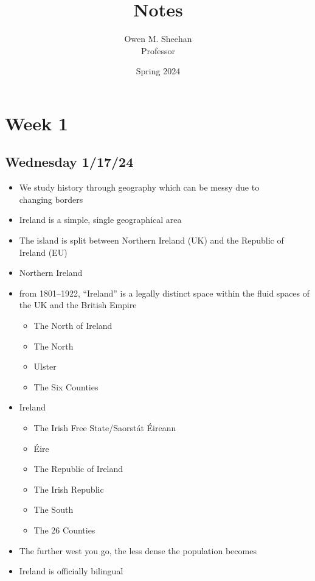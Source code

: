 \documentclass[12pt]{article}
\title{\class{} Notes}
\author{Owen M. Sheehan\\Professor \prof{}}
\date{Spring 2024}
\begin{document}
\maketitle
\tableofcontents
\newpage
    \section{Week 1}
        \subsection{Wednesday 1/17/24}
            \begin{itemize}
                \item We study history through geography which can be messy due to \\changing borders
                \item Ireland is a simple, single geographical area
                \item The island is split between Northern Ireland (UK) and the Republic of Ireland (EU)
                \item Northern Ireland
                \item from 1801--1922, ``Ireland'' is a legally distinct space within the fluid spaces of the UK and the British Empire
                \begin{itemize}
                    \item The North of Ireland
                    \item The North
                    \item Ulster
                    \item The Six Counties
                \end{itemize}
                \item Ireland
                \begin{itemize}
                    \item The Irish Free State/Saorstát Éireann
                    \item Éire
                    \item The Republic of Ireland
                    \item The Irish Republic
                    \item The South
                    \item The 26 Counties
                \end{itemize}
                \item The further west you go, the less dense the population becomes
                \item Ireland is officially bilingual


\end{itemize}
\end{document}
